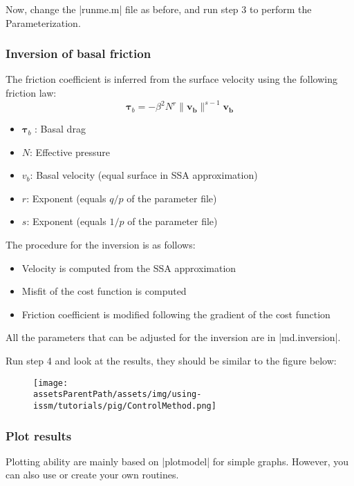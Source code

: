 Now, change the \lstinlinebg|runme.m| file as before, and run step 3 to perform the Parameterization.
\subsubsection{Inversion of basal friction}%
The friction coefficient is inferred from the surface velocity using the following friction law:
\begin{equation}
	\mathbf{ \tau }_b = -\beta^{2} N^r \|\mathbf{v_b}\|^{s-1}\mathbf{v_b}
\end{equation}

\begin{itemize}
	\item $\mathbf{ \tau }_b$ : Basal drag
	\item $N$: Effective pressure
	\item $v_b$: Basal velocity (equal surface in SSA approximation)
	\item $r$: Exponent (equals $q/p$ of the parameter file)
	\item $s$: Exponent (equals $1/p$ of the parameter file)
\end{itemize}

The procedure for the inversion is as follows:
\begin{itemize}
	\item Velocity is computed from the SSA approximation
	\item Misfit of the cost function is computed
	\item Friction coefficient is modified following the gradient of the cost function
\end{itemize}

All the parameters that can be adjusted for the inversion are in \lstinlinebg|md.inversion|.

Run step 4 and look at the results, they should be similar to the figure below:
\begin{figure}[H]
	\begin{center}
		\texttt{[image: \\assetsParentPath/assets/img/using-issm/tutorials/pig/ControlMethod.png]}
	\end{center}
\end{figure}
\subsubsection{Plot results}%
Plotting ability are mainly based on \lstinlinebg|plotmodel| for simple graphs. However, you can also use or create your own routines.


